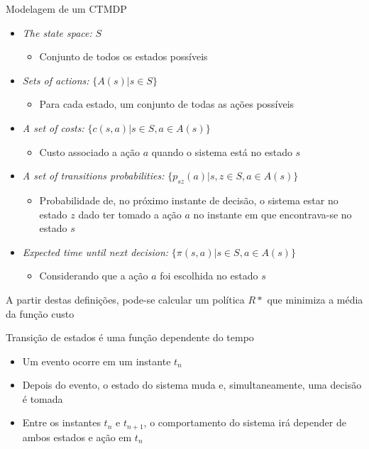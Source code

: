 \begin{frame}
  \begin{block}{Modelagem de um CTMDP}
    \begin{itemize}
      \pause
      \item \alert{\textit{The state space:}} $S$
      \begin{itemize}
        \item Conjunto de todos os estados possíveis
      \end{itemize}
      \pause
      \item \alert{\textit{Sets of actions:}} $\{ A(s) | s \in S\}$
      \begin{itemize}
        \item Para cada estado, um conjunto de todas as ações possíveis
      \end{itemize}
      \pause
      \item \alert{\textit{A set of costs:}} $\{c(s,a) | s \in S, a \in A(s) \}$
      \begin{itemize}
        \item Custo associado a ação $a$ quando o sistema está no
        estado $s$
      \end{itemize}
      \pause
      \item \alert{\textit{A set of transitions probabilities:}}
      $ \{ p_{sz}(a) | s,z \in S, a \in A(s) \}$
      \begin{itemize}
        \item Probabilidade de, no próximo instante de decisão, o sistema estar
        no estado $z$ dado ter tomado a ação $a$ no instante em que
        encontrava-se no estado $s$
      \end{itemize}
      \pause
      \item \alert{\textit{Expected time until next decision:}}
      $ \{ \pi (s,a) | s \in S, a \in A(s) \}$
      \begin{itemize}
        \item Considerando que a ação $a$ foi escolhida no estado $s$
      \end{itemize}
    \end{itemize}
  \end{block}
  \pause
  A partir destas definições, pode-se calcular um política $R*$ que minimiza a
  média da função custo
\end{frame}

\begin{frame}
  \begin{block}{Transição de estados é uma função dependente do tempo}
    \begin{itemize}
      \item Um evento ocorre em um instante $t_n$
      \item Depois do evento, o estado do sistema muda e, simultaneamente, uma
      decisão é tomada
      \item Entre os instantes $t_n$ e $t_{n+1}$, o comportamento do sistema
      irá depender de ambos estados e ação em $t_n$
    \end{itemize}
  \end{block}
\end{frame}

